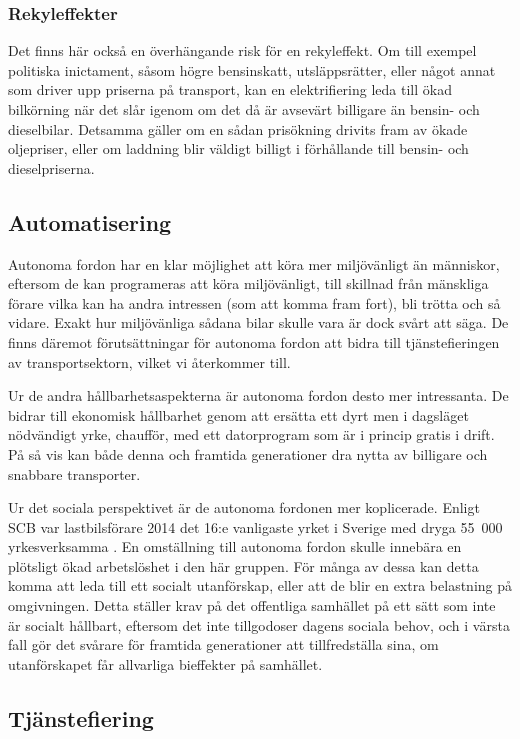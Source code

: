 \documentclass{article}
\begin{document}
\subsubsection{Rekyleffekter}

Det finns här också en överhängande risk för en rekyleffekt. Om till exempel politiska inictament, såsom högre bensinskatt, utsläppsrätter, eller något annat som driver upp priserna på transport, kan en elektrifiering leda till ökad bilkörning när det slår igenom om det då är avsevärt billigare än bensin- och dieselbilar. Detsamma gäller om en sådan prisökning drivits fram av ökade oljepriser, eller om laddning blir väldigt billigt i förhållande till bensin- och dieselpriserna.

\subsection{Automatisering}

Autonoma fordon har en klar möjlighet att köra mer miljövänligt än människor, eftersom de kan programeras att köra miljövänligt, till skillnad från mänskliga förare vilka kan ha andra intressen (som att komma fram fort), bli trötta och så vidare. Exakt hur miljövänliga sådana bilar skulle vara är dock svårt att säga. De finns däremot förutsättningar för autonoma fordon att bidra till tjänstefieringen av transportsektorn, vilket vi återkommer till.

Ur de andra hållbarhetsaspekterna är autonoma fordon desto mer intressanta. De bidrar till ekonomisk hållbarhet genom att ersätta ett dyrt men i dagsläget nödvändigt yrke, chaufför, med ett datorprogram som är i princip gratis i drift. På så vis kan både denna och framtida generationer dra nytta av billigare och snabbare transporter.

Ur det sociala perspektivet är de autonoma fordonen mer koplicerade. Enligt SCB var lastbilsförare 2014 det 16:e vanligaste yrket i Sverige med dryga 55\ 000 yrkesverksamma . En omställning till autonoma fordon skulle innebära en plötsligt ökad arbetslöshet i den här gruppen. För många av dessa kan detta komma att leda till ett socialt utanförskap, eller att de blir en extra belastning på omgivningen. Detta ställer krav på det offentliga samhället på ett sätt som inte är socialt hållbart, eftersom det inte tillgodoser dagens sociala behov, och i värsta fall gör det svårare för framtida generationer att tillfredställa sina, om utanförskapet får allvarliga bieffekter på samhället.

\subsection{Tjänstefiering}
\end{document}
